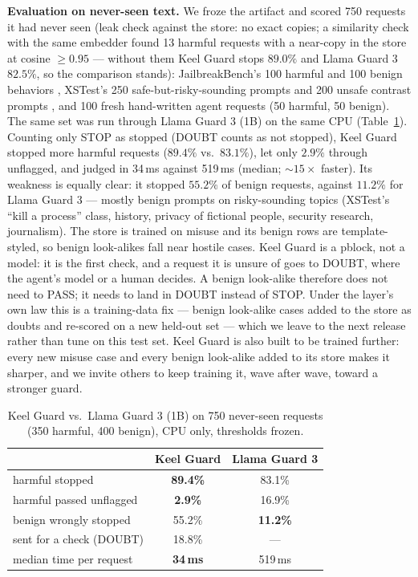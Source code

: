 \documentclass[11pt]{article}
\begin{document}
\textbf{Evaluation on never-seen text.} We froze the artifact and scored 750 requests it had never seen (leak check against the store: no exact copies; a similarity check with the same embedder found 13 harmful requests with a near-copy in the store at cosine $\geq 0.95$ --- without them Keel Guard stops $89.0\%$ and Llama Guard 3 $82.5\%$, so the comparison stands): JailbreakBench's 100 harmful and 100 benign behaviors \cite{chao2024jailbreakbench}, XSTest's 250 safe-but-risky-sounding prompts and 200 unsafe contrast prompts \cite{rottger2024xstest}, and 100 fresh hand-written agent requests (50 harmful, 50 benign). The same set was run through Llama Guard 3 (1B) \cite{ollama2026llamaguard3} on the same CPU (Table~\ref{tab:keelguard}). Counting only STOP as stopped (DOUBT counts as not stopped), Keel Guard stopped more harmful requests ($89.4\%$ vs.\ $83.1\%$), let only $2.9\%$ through unflagged, and judged in 34\,ms against 519\,ms (median; ${\sim}15\times$ faster). Its weakness is equally clear: it stopped $55.2\%$ of benign requests, against $11.2\%$ for Llama Guard 3 --- mostly benign prompts on risky-sounding topics (XSTest's ``kill a process'' class, history, privacy of fictional people, security research, journalism). The store is trained on misuse and its benign rows are template-styled, so benign look-alikes fall near hostile cases. Keel Guard is a pblock, not a model: it is the first check, and a request it is unsure of goes to DOUBT, where the agent's model or a human decides. A benign look-alike therefore does not need to PASS; it needs to land in DOUBT instead of STOP. Under the layer's own law this is a training-data fix --- benign look-alike cases added to the store as doubts and re-scored on a new held-out set --- which we leave to the next release rather than tune on this test set. Keel Guard is also built to be trained further: every new misuse case and every benign look-alike added to its store makes it sharper, and we invite others to keep training it, wave after wave, toward a stronger guard.

\begin{table}[htbp]
\centering
\small
\caption{Keel Guard vs.\ Llama Guard 3 (1B) on 750 never-seen requests (350 harmful, 400 benign), CPU only, thresholds frozen.}
\label{tab:keelguard}
\begin{tabular}{lcc}
\toprule
 & Keel Guard & Llama Guard 3 \\
\midrule
harmful stopped & \textbf{89.4\%} & 83.1\% \\
harmful passed unflagged & \textbf{2.9\%} & 16.9\% \\
benign wrongly stopped & 55.2\% & \textbf{11.2\%} \\
sent for a check (DOUBT) & 18.8\% & --- \\
median time per request & \textbf{34\,ms} & 519\,ms \\
\bottomrule
\end{tabular}
\end{table}
\end{document}
